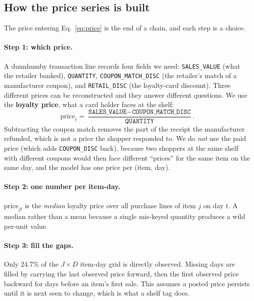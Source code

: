 \documentclass[11pt]{article}
\newcommand{\code}[1]{\texttt{#1}}
\begin{document}
\subsection{How the price series is built}
\label{sec:pricebuild}

The price entering Eq.~\ref{eq:price} is the end of a chain, and each step is a choice.

\paragraph{Step 1: which price.} A dunnhumby transaction line records
four fields we need: \code{SALES\_VALUE} (what the retailer
banked), \code{QUANTITY}, \code{COUPON\_MATCH\_DISC} (the retailer's match of a
manufacturer coupon), and \code{RETAIL\_DISC} (the loyalty-card discount). Three different
prices can be reconstructed and they answer different questions. We use the
\textbf{loyalty price}, what a card holder faces at the shelf:
\begin{equation}
\mathrm{price}_{\ell} = \frac{\texttt{SALES\_VALUE} - \texttt{COUPON\_MATCH\_DISC}}{\texttt{QUANTITY}} .
\end{equation}
Subtracting the coupon match removes the part of the receipt the manufacturer refunded,
which is not a price the shopper responded to. We do \emph{not} use the paid price
(which adds \code{COUPON\_DISC} back), because two shoppers at the same shelf with
different coupons would then face different ``prices'' for the same item on the same day,
and the model has one price per (item, day).

\paragraph{Step 2: one number per item-day.} $\mathrm{price}_{jt}$ is the \emph{median}
loyalty price over all purchase lines of item $j$ on day $t$. A median rather than a mean
because a single mis-keyed quantity produces a wild per-unit value.

\paragraph{Step 3: fill the gaps.} Only 24.7\% of the $J\times D$ item-day grid is
directly observed. Missing days are filled by carrying the last observed price forward,
then the first observed price backward for days before an item's first sale. This assumes
a posted price persists until it is next seen to change, which is what a shelf tag does.
\end{document}

